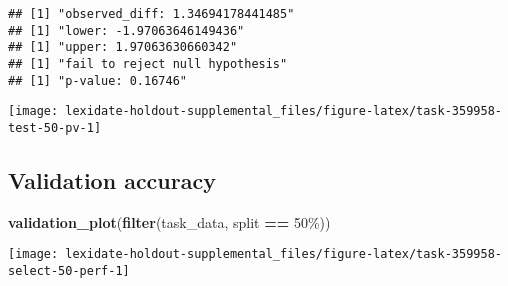 \documentclass[
]{book}
\newenvironment{Shaded}{\begin{snugshade}}{\end{snugshade}}
\newcommand{\AttributeTok}[1]{\textcolor[rgb]{0.13,0.29,0.53}{#1}}
\newcommand{\DecValTok}[1]{\textcolor[rgb]{0.00,0.00,0.81}{#1}}
\newcommand{\FunctionTok}[1]{\textcolor[rgb]{0.13,0.29,0.53}{\textbf{#1}}}
\newcommand{\NormalTok}[1]{#1}
\newcommand{\OtherTok}[1]{\textcolor[rgb]{0.56,0.35,0.01}{#1}}
\newcommand{\SpecialCharTok}[1]{\textcolor[rgb]{0.81,0.36,0.00}{\textbf{#1}}}
\newcommand{\StringTok}[1]{\textcolor[rgb]{0.31,0.60,0.02}{#1}}
\begin{document}
\begin{Shaded}
\end{Shaded}

\begin{verbatim}
## [1] "observed_diff: 1.34694178441485"
## [1] "lower: -1.97063646149436"
## [1] "upper: 1.97063630660342"
## [1] "fail to reject null hypothesis"
## [1] "p-value: 0.16746"
\end{verbatim}

\texttt{[image: lexidate-holdout-supplemental\_files/figure-latex/task-359958-test-50-pv-1]}

\hypertarget{validation-accuracy-32}{%
\subsection{Validation accuracy}\label{validation-accuracy-32}}

\begin{Shaded}
\begin{Highlighting}[]
\FunctionTok{validation\_plot}\NormalTok{(}\FunctionTok{filter}\NormalTok{(task\_data, split }\SpecialCharTok{==} \StringTok{\textquotesingle{}50\%\textquotesingle{}}\NormalTok{))}
\end{Highlighting}
\end{Shaded}

\texttt{[image: lexidate-holdout-supplemental\_files/figure-latex/task-359958-select-50-perf-1]}
\end{document}
